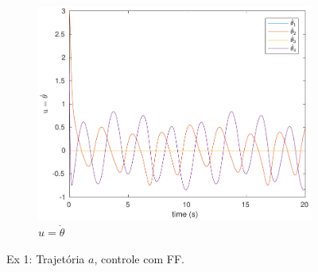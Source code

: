 \documentclass[a4paper,11pt]{article}
\theoremstyle{mytheor}
\begin{document}
\begin{figure}[!ht]
\begin{minipage}{\linewidth}
\begin{subfigure}[b]{0.45\textwidth}
    \end{subfigure}
    \begin{subfigure}[b]{0.45\textwidth}
    \includegraphics[width=1\textwidth]{figs/ex1_a_1_dq.pdf}
    \caption{$u = \dot{\theta}$}
    \label{fig:ex1_a_1_dq}
    \end{subfigure}
  \end{minipage}
\caption{Ex 1: Trajetória $a$, controle com FF.}
\label{fig:ex1_a_1}
\end{figure}
\end{document}

